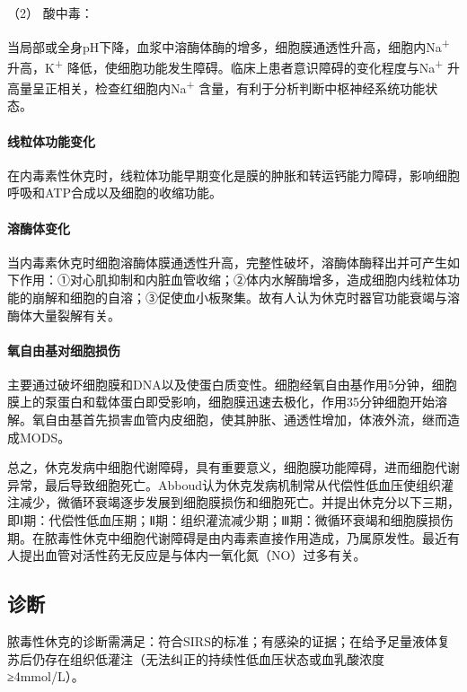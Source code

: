 \hypertarget{text00057.htmlux5cux23CHP2-2-1-3-2-1-2}{}
（2） 酸中毒：

当局部或全身pH下降，血浆中溶酶体酶的增多，细胞膜通透性升高，细胞内Na\textsuperscript{+}
升高，K\textsuperscript{+}
降低，使细胞功能发生障碍。临床上患者意识障碍的变化程度与Na\textsuperscript{+}
升高量呈正相关，检查红细胞内Na\textsuperscript{+}
含量，有利于分析判断中枢神经系统功能状态。

\paragraph{线粒体功能变化}

在内毒素性休克时，线粒体功能早期变化是膜的肿胀和转运钙能力障碍，影响细胞呼吸和ATP合成以及细胞的收缩功能。

\paragraph{溶酶体变化}

当内毒素休克时细胞溶酶体膜通透性升高，完整性破坏，溶酶体酶释出并可产生如下作用：①对心肌抑制和内脏血管收缩；②体内水解酶增多，造成细胞内线粒体功能的崩解和细胞的自溶；③促使血小板聚集。故有人认为休克时器官功能衰竭与溶酶体大量裂解有关。

\paragraph{氧自由基对细胞损伤}

主要通过破坏细胞膜和DNA以及使蛋白质变性。细胞经氧自由基作用5分钟，细胞膜上的泵蛋白和载体蛋白即受影响，细胞膜迅速去极化，作用35分钟细胞开始溶解。氧自由基首先损害血管内皮细胞，使其肿胀、通透性增加，体液外流，继而造成MODS。

总之，休克发病中细胞代谢障碍，具有重要意义，细胞膜功能障碍，进而细胞代谢异常，最后导致细胞死亡。Abboud认为休克发病机制常从代偿性低血压使组织灌注减少，微循环衰竭逐步发展到细胞膜损伤和细胞死亡。并提出休克分以下三期，即Ⅰ期：代偿性低血压期；Ⅱ期：组织灌流减少期；Ⅲ期：微循环衰竭和细胞膜损伤期。在脓毒性休克中细胞代谢障碍是由内毒素直接作用造成，乃属原发性。最近有人提出血管对活性药无反应是与体内一氧化氮（NO）过多有关。

\subsection{诊断}

脓毒性休克的诊断需满足：符合SIRS的标准；有感染的证据；在给予足量液体复苏后仍存在组织低灌注（无法纠正的持续性低血压状态或血乳酸浓度≥4mmol/L）。

